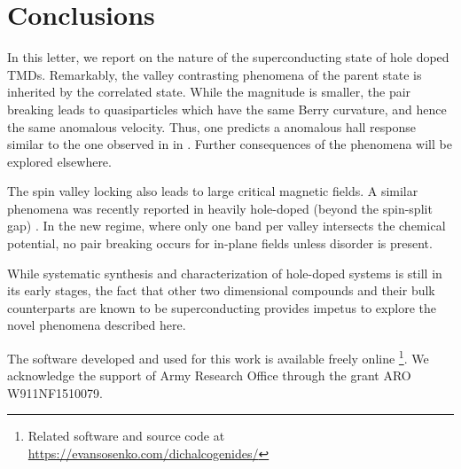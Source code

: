 \section{Conclusions}

In this letter, we report on the nature of the superconducting state
of hole doped TMDs.
Remarkably, the valley contrasting phenomena of the parent state
is inherited by the correlated state.
While the magnitude is smaller, the pair breaking leads to quasiparticles
which have the same Berry curvature, and hence the same anomalous velocity.
Thus, one predicts a anomalous hall response similar to
the one observed in in .
Further consequences of the phenomena will be explored elsewhere.

The spin valley locking also leads to large critical magnetic fields.
A similar phenomena was recently reported in heavily hole-doped
(beyond the spin-split gap) .
In the new regime, where only one band per valley intersects
the chemical potential, no pair breaking occurs
for in-plane fields unless disorder is present.

While systematic synthesis and characterization of hole-doped systems
is still in its early stages, the fact that other two dimensional compounds
and their bulk counterparts are known to be superconducting
provides impetus to explore the novel phenomena described here.

The software developed and used for this work
is available freely online
\footnote{%
  Related software and source code at \\
  \url{https://evansosenko.com/dichalcogenides/}
}.
We acknowledge the support of Army Research Office through the grant
ARO W911NF1510079.
